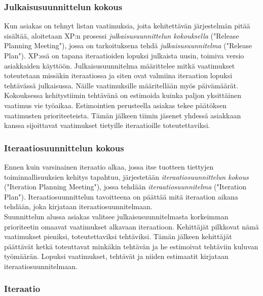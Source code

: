 \documentclass[finnish]{../tktltiki2}
\theoremstyle{definition}
\theoremstyle{remark}
\begin{document}
\subsubsection{Julkaisusuunnittelun kokous}

Kun asiakas on tehnyt listan vaatimuksia, joita kehitettävän järjestelmän pitää sisältää, aloitetaan XP:n prosessi \emph{julkaisusuunnittelun kokouksella} ("Release Planning Meeting"),
jossa on tarkoituksena tehdä \emph{julkaisusuunnitelma} ("Release Plan"). XP:ssä on tapana iteraatioiden lopuksi julkaista uusin, toimiva versio asiakkaiden käyttöön. Julkaisusuunnitelma määrittelee mitkä vaatimukset toteutetaan missäkin iteraatiossa ja siten ovat valmiina iteraation lopuksi tehtävässä julkaisussa. Näille vaatimuksille määritellään myös päivämäärät.\\

Kokouksessa kehitystiimin tehtävänä on estimoida kuinka paljon yksittäinen vaatimus vie työaikaa. Estimointien perusteella asiakas
tekee päätöksen vaatimusten prioriteeteista. Tämän jälkeen tiimin jäsenet
yhdessä asiakkaan kanssa sijoittavat vaatimukset tietyille iteraatioille toteutettaviksi.

\subsubsection{Iteraatiosuunnittelun kokous}

Ennen kuin varsinainen iteraatio alkaa, jossa itse tuotteen tiettyjen toiminnallisuuksien
kehitys tapahtuu, järjestetään \emph{iteraatiosuunnittelun kokous} ("Iteration Planning Meeting"), jossa tehdään \emph{iteraatiosuunnitelma} ("Iteration Plan"). Iteraatiosuunnittelun tavoitteena on päättää mitä iteraation aikana tehdään, joka kirjataan iteraatiosuunnitelmaan.\\

Suunnittelun alussa asiakas valitsee julkaisusuunnitelmasta korkeimman prioriteetin omaavat vaatimukset alkavaan iteraatioon. Kehittäjät pilkkovat nämä vaatimukset pieniksi, toteutettaviksi tehtäviksi. Tämän jälkeen kehittäjät päättävät ketkä toteuttavat minkäkin tehtävän ja he estimoivat tehtäviin kuluvan työmäärän. Lopuksi vaatimukset, tehtävät ja niiden estimaatit kirjataan iteraatiosuunnitelmaan.

\subsubsection{Iteraatio}
\end{document}
